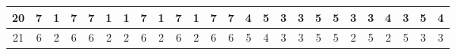 \begin{sidewaystable}[]
\begin{tabular}{|c|c|c|c|c|c|c|c|c|c|c|c|c|c|c|c|c|c|c|c|c|c|c|c|c|}
    20      & 7                                               & 1                                               & 7                                               & 7                                               & 1                                               & 1                                               & 7                                               & 1                                               & 7                                               & 1                                                & 7                                                & 7                                                & 4                                               & 5                                               & 3                                               & 3                                               & 5                                               & 5                                               & 3                                               & 3                                               & 4                                               & 3                                                & 5                                                & 4                                                \\ \hline
    21      & 6                                               & 2                                               & 6                                               & 6                                               & 2                                               & 2                                               & 6                                               & 2                                               & 6                                               & 2                                                & 6                                                & 6                                                & 5                                               & 4                                               & 3                                               & 3                                               & 5                                               & 5                                               & 2                                               & 5                                               & 2                                               & 5                                                & 3                                                & 3                                                \\ \hline

\end{tabular}
\end{sidewaystable}
